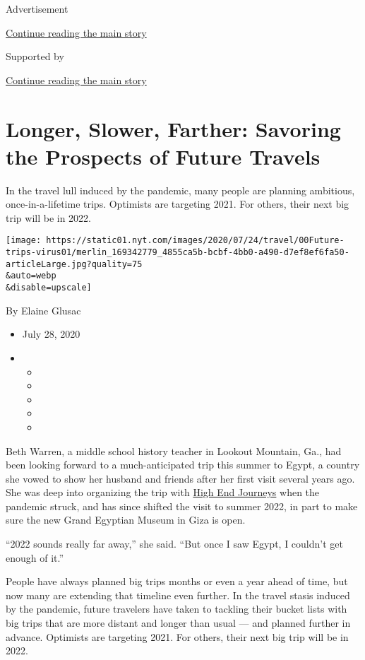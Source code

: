 Advertisement

\protect\hyperlink{after-top}{Continue reading the main story}

Supported by

\protect\hyperlink{after-sponsor}{Continue reading the main story}

\hypertarget{longer-slower-farther-savoring-the-prospects-of-future-travels}{%
\section{Longer, Slower, Farther: Savoring the Prospects of Future
Travels}\label{longer-slower-farther-savoring-the-prospects-of-future-travels}}

In the travel lull induced by the pandemic, many people are planning
ambitious, once-in-a-lifetime trips. Optimists are targeting 2021. For
others, their next big trip will be in 2022.

\texttt{[image: https://static01.nyt.com/images/2020/07/24/travel/00Future-trips-virus01/merlin\_169342779\_4855ca5b-bcbf-4bb0-a490-d7ef8ef6fa50-articleLarge.jpg?quality=75\\\&auto=webp\\\&disable=upscale]}

By Elaine Glusac

\begin{itemize}
\item
  July 28, 2020
\item
  \begin{itemize}
  \item
  \item
  \item
  \item
  \item
  \end{itemize}
\end{itemize}

Beth Warren, a middle school history teacher in Lookout Mountain, Ga.,
had been looking forward to a much-anticipated trip this summer to
Egypt, a country she vowed to show her husband and friends after her
first visit several years ago. She was deep into organizing the trip
with \href{https://www.highendjourneys.com/}{High End Journeys} when the
pandemic struck, and has since shifted the visit to summer 2022, in part
to make sure the new Grand Egyptian Museum in Giza is open.

``2022 sounds really far away,'' she said. ``But once I saw Egypt, I
couldn't get enough of it.''

People have always planned big trips months or even a year ahead of
time, but now many are extending that timeline even further. In the
travel stasis induced by the pandemic, future travelers have taken to
tackling their bucket lists with big trips that are more distant and
longer than usual --- and planned further in advance. Optimists are
targeting 2021. For others, their next big trip will be in 2022.

